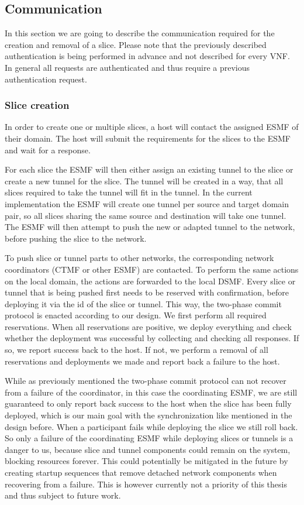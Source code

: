 \subsection{Communication}
\label{impl_communication}
In this section we are going to describe the communication required for the creation and removal of a slice. Please note that the previously described authentication is being performed in advance and not described for every VNF. In general all requests are authenticated and thus require a previous authentication request.

\subsubsection{Slice creation}
In order to create one or multiple slices, a host will contact the assigned ESMF of their domain. The host will submit the requirements for the slices to the ESMF and wait for a response.

For each slice the ESMF will then either assign an existing tunnel to the slice or create a new tunnel for the slice. The tunnel will be created in a way, that all slices required to take the tunnel will fit in the tunnel. In the current implementation the ESMF will create one tunnel per source and target domain pair, so all slices sharing the same source and destination will take one tunnel. The ESMF will then attempt to push the new or adapted tunnel to the network, before pushing the slice to the network.

To push slice or tunnel parts to other networks, the corresponding network coordinators (CTMF or other ESMF) are contacted. To perform the same actions on the local domain, the actions are forwarded to the local DSMF. Every slice or tunnel that is being pushed first needs to be reserved with confirmation, before deploying it via the id of the slice or tunnel. This way, the two-phase commit protocol is enacted according to our design. We first perform all required reservations. When all reservations are positive, we deploy everything and check whether the deployment was successful by collecting and checking all responses. If so, we report success back to the host. If not, we perform a removal of all reservations and deployments we made and report back a failure to the host.

While as previously mentioned the two-phase commit protocol can not recover from a failure of the coordinator, in this case the coordinating ESMF, we are still guaranteed to only report back success to the host when the slice has been fully deployed, which is our main goal with the synchronization like mentioned in the design before. When a participant fails while deploying the slice we still roll back. So only a failure of the coordinating ESMF while deploying slices or tunnels is a danger to us, because slice and tunnel components could remain on the system, blocking resources forever. This could potentially be mitigated in the future by creating startup sequences that remove detached network components when recovering from a failure. This is however currently not a priority of this thesis and thus subject to future work.

